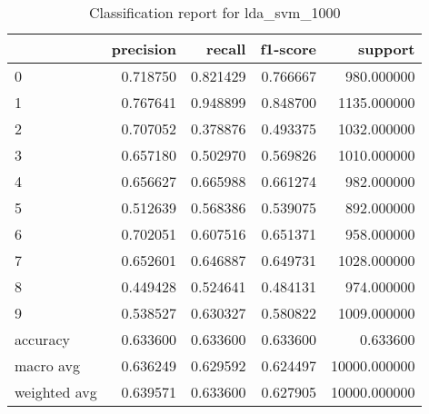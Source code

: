 \begin{table}[htb!]
\centering
\caption{Classification report for lda_svm_1000}
\label{tab:classification-report-lda_svm_1000}
\begin{tabular}{lrrrr}
\toprule
 & precision & recall & f1-score & support \\
\midrule
0 & 0.718750 & 0.821429 & 0.766667 & 980.000000 \\
1 & 0.767641 & 0.948899 & 0.848700 & 1135.000000 \\
2 & 0.707052 & 0.378876 & 0.493375 & 1032.000000 \\
3 & 0.657180 & 0.502970 & 0.569826 & 1010.000000 \\
4 & 0.656627 & 0.665988 & 0.661274 & 982.000000 \\
5 & 0.512639 & 0.568386 & 0.539075 & 892.000000 \\
6 & 0.702051 & 0.607516 & 0.651371 & 958.000000 \\
7 & 0.652601 & 0.646887 & 0.649731 & 1028.000000 \\
8 & 0.449428 & 0.524641 & 0.484131 & 974.000000 \\
9 & 0.538527 & 0.630327 & 0.580822 & 1009.000000 \\
accuracy & 0.633600 & 0.633600 & 0.633600 & 0.633600 \\
macro avg & 0.636249 & 0.629592 & 0.624497 & 10000.000000 \\
weighted avg & 0.639571 & 0.633600 & 0.627905 & 10000.000000 \\
\bottomrule
\end{tabular}
\end{table}
